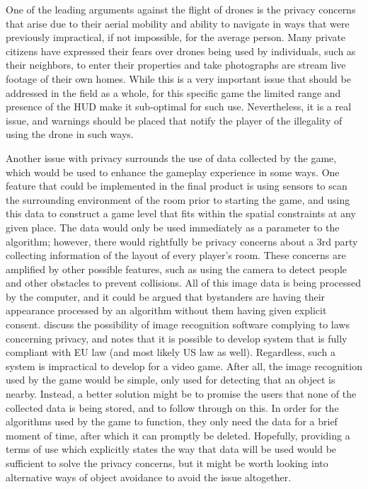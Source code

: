 \documentclass[10pt,twocolumn]{article}
\begin{document}
One of the leading arguments against the flight of drones is the privacy concerns that arise due to their aerial mobility and ability to navigate in ways that were previously impractical, if not impossible, for the average person. Many private citizens have expressed their fears over drones being used by individuals, such as their neighbors, to enter their properties and take photographs are stream live footage of their own homes. While this is a very important issue that should be addressed in the field as a whole, for this specific game the limited range and presence of the HUD make it sub-optimal for such use. Nevertheless, it is a real issue, and warnings should be placed that notify the player of the illegality of using the drone in such ways.

Another issue with privacy surrounds the use of data collected by the game, which would be used to enhance the gameplay experience in some ways. One feature that could be implemented in the final product is using sensors to scan the surrounding environment of the room prior to starting the game, and using this data to construct a game level that fits within the spatial constraints at any given place. The data would only be used immediately as a parameter to the algorithm; however, there would rightfully be privacy concerns about a 3rd party collecting information of the layout of every player's room. These concerns are amplified by other possible features, such as using the camera to detect people and other obstacles to prevent collisions. All of this image data is being processed by the computer, and it could be argued that bystanders are having their appearance processed by an algorithm without them having given explicit consent. \citeauthor{CameraPrivacy}\cite{CameraPrivacy} discuss the possibility of image recognition software complying to laws concerning privacy, and notes that it is possible to develop system that is fully compliant with EU law (and most likely US law as well). Regardless, such a system is impractical to develop for a video game. After all, the image recognition used by the game would be simple, only used for detecting that an object is nearby. Instead, a better solution might be to promise the users that none of the collected data is being stored, and to follow through on this. In order for the algorithms used by the game to function, they only need the data for a brief moment of time, after which it can promptly be deleted. Hopefully, providing a terms of use which explicitly states the way that data will be used would be sufficient to solve the privacy concerns, but it might be worth looking into alternative ways of object avoidance to avoid the issue altogether.
\end{document}
